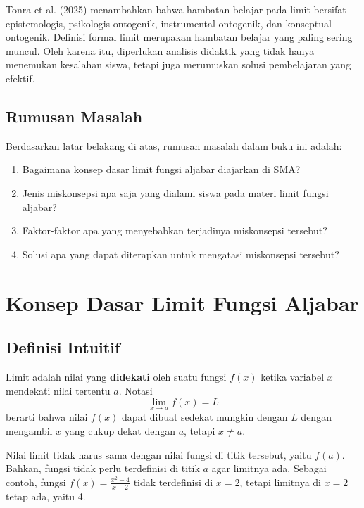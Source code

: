\documentclass[12pt,a4paper,openany]{book}
\theoremstyle{definition}
\begin{document}
Tonra et al. (2025) menambahkan bahwa hambatan belajar pada limit bersifat epistemologis, psikologis-ontogenik, instrumental-ontogenik, dan konseptual-ontogenik. Definisi formal limit merupakan hambatan belajar yang paling sering muncul. Oleh karena itu, diperlukan analisis didaktik yang tidak hanya menemukan kesalahan siswa, tetapi juga merumuskan solusi pembelajaran yang efektif.

\section{Rumusan Masalah}

Berdasarkan latar belakang di atas, rumusan masalah dalam buku ini adalah:
\begin{enumerate}
  \item Bagaimana konsep dasar limit fungsi aljabar diajarkan di SMA?
  \item Jenis miskonsepsi apa saja yang dialami siswa pada materi limit fungsi aljabar?
  \item Faktor-faktor apa yang menyebabkan terjadinya miskonsepsi tersebut?
  \item Solusi apa yang dapat diterapkan untuk mengatasi miskonsepsi tersebut?
\end{enumerate}

\chapter{Konsep Dasar Limit Fungsi Aljabar}

\section{Definisi Intuitif}

Limit adalah nilai yang \textbf{didekati} oleh suatu fungsi $f(x)$ ketika variabel $x$ mendekati nilai tertentu $a$. Notasi
\[
\lim_{x \to a} f(x) = L
\]
berarti bahwa nilai $f(x)$ dapat dibuat sedekat mungkin dengan $L$ dengan mengambil $x$ yang cukup dekat dengan $a$, tetapi $x \neq a$.

Nilai limit tidak harus sama dengan nilai fungsi di titik tersebut, yaitu $f(a)$. Bahkan, fungsi tidak perlu terdefinisi di titik $a$ agar limitnya ada. Sebagai contoh, fungsi $f(x) = \frac{x^2-4}{x-2}$ tidak terdefinisi di $x = 2$, tetapi limitnya di $x = 2$ tetap ada, yaitu 4.
\end{document}
